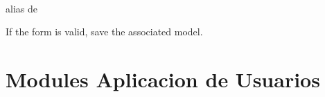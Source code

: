 \documentclass[letterpaper,10pt,spanish]{sphinxmanual}
\begin{document}
\begin{fulllineitems}
\label{\detokenize{modules/users/views:users.views.SignUp}}~

\begin{fulllineitems}
\label{\detokenize{modules/users/views:users.views.SignUp.form_class}}
alias de {\hyperref[\detokenize{modules/users/forms:users.forms.CustomUserCreationForm}]{}}

\end{fulllineitems}


\begin{fulllineitems}
\label{\detokenize{modules/users/views:users.views.SignUp.form_valid}}
If the form is valid, save the associated model.

\end{fulllineitems}


\end{fulllineitems}



\section{Modules Aplicacion de Usuarios}
\label{\detokenize{modules/users/models:module-users.models}}\label{\detokenize{modules/users/models:modules-aplicacion-de-usuarios}}\label{\detokenize{modules/users/models::doc}}
\end{document}
